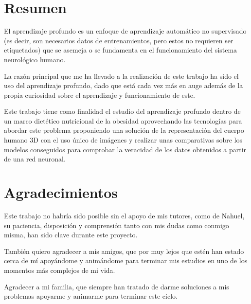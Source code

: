 
\chapter*{Resumen}
\thispagestyle{empty}

El aprendizaje profundo es un enfoque de aprendizaje automático no supervisado (es decir, son necesarios datos de entrenamientos, pero estos no requieren ser etiquetados) que se asemeja o se fundamenta en el funcionamiento del sistema neurológico humano.

La razón principal que me ha llevado a la realización de este trabajo ha sido el uso del aprendizaje profundo, dado que está cada vez más en auge además de la propia curiosidad sobre el aprendizaje y funcionamiento de este.

Este trabajo tiene como finalidad el estudio del aprendizaje profundo dentro de un marco dietético nutricional de la obesidad aprovechando las tecnologías para abordar este problema proponiendo una solución de la representación del cuerpo humano 3D con el uso único de imágenes y realizar unas comparativas sobre los modelos conseguidos para comprobar la veracidad de los datos obtenidos a partir de una red neuronal.



\cleardoublepage %
\chapter*{Agradecimientos
}

\thispagestyle{empty}
\vspace{1cm}

Este trabajo no habría sido posible sin el apoyo de mis tutores, como de Nahuel, su paciencia, disposición y comprensión tanto con mis dudas como conmigo misma, han sido clave durante este proyecto.

También quiero agradecer a mis amigos, que por muy lejos que estén han estado cerca de mí apoyándome y animándome para terminar mis estudios en uno de los momentos más complejos de mi vida.

Agradecer a mi familia, que siempre han tratado de darme soluciones a mis problemas apoyarme y animarme para terminar este ciclo.

